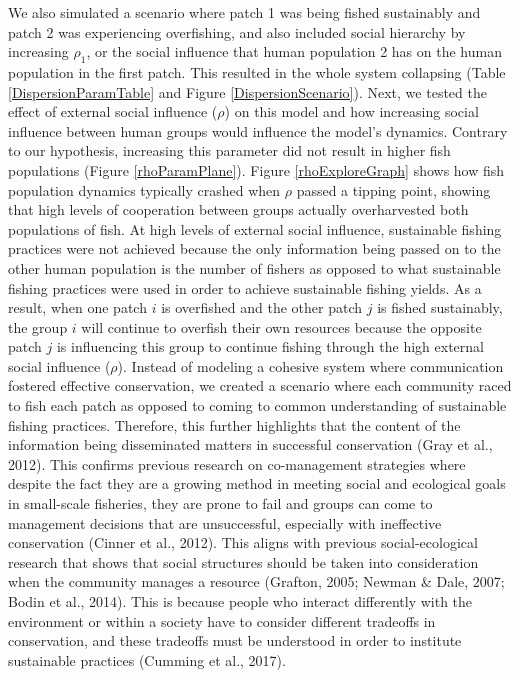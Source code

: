 \documentclass[
  12pt,
]{article}
\begin{document}
We also simulated a scenario where patch 1 was being fished sustainably and patch 2 was experiencing overfishing, and also included social hierarchy by increasing \(\rho_1\), or the social influence that human population 2 has on the human population in the first patch. This resulted in the whole system collapsing (Table \ref{DispersionParamTable} and Figure \ref{DispersionScenario}). Next, we tested the effect of external social influence (\(\rho\)) on this model and how increasing social influence between human groups would influence the model's dynamics. Contrary to our hypothesis, increasing this parameter did not result in higher fish populations (Figure \ref{rhoParamPlane}). Figure \ref{rhoExploreGraph} shows how fish population dynamics typically crashed when \(\rho\) passed a tipping point, showing that high levels of cooperation between groups actually overharvested both populations of fish. At high levels of external social influence, sustainable fishing practices were not achieved because the only information being passed on to the other human population is the number of fishers as opposed to what sustainable fishing practices were used in order to achieve sustainable fishing yields. As a result, when one patch \(i\) is overfished and the other patch \(j\) is fished sustainably, the group \(i\) will continue to overfish their own resources because the opposite patch \(j\) is influencing this group to continue fishing through the high external social influence (\(\rho\)). Instead of modeling a cohesive system where communication fostered effective conservation, we created a scenario where each community raced to fish each patch as opposed to coming to common understanding of sustainable fishing practices. Therefore, this further highlights that the content of the information being disseminated matters in successful conservation (Gray et al., 2012). This confirms previous research on co-management strategies where despite the fact they are a growing method in meeting social and ecological goals in small-scale fisheries, they are prone to fail and groups can come to management decisions that are unsuccessful, especially with ineffective conservation (Cinner et al., 2012). This aligns with previous social-ecological research that shows that social structures should be taken into consideration when the community manages a resource (Grafton, 2005; Newman \& Dale, 2007; Bodin et al., 2014). This is because people who interact differently with the environment or within a society have to consider different tradeoffs in conservation, and these tradeoffs must be understood in order to institute sustainable practices (Cumming et al., 2017).
\end{document}
